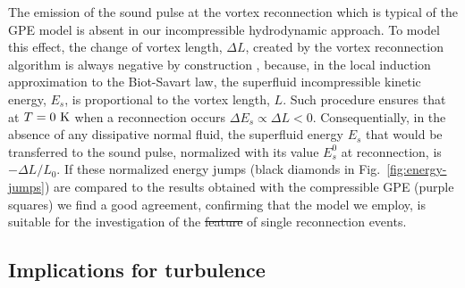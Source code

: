 \documentclass[9pt,twocolumn,twoside]{pnas-new}
\providecommand{\DIFadd}[1]{{\protect\color{blue}\uwave{#1}}} %
\providecommand{\DIFdel}[1]{{\protect\color{red}\sout{#1}}} %
\providecommand{\DIFaddbegin}{} %
\providecommand{\DIFaddend}{} %
\providecommand{\DIFdelbegin}{} %
\providecommand{\DIFdelend}{} %
\newcommand{\DIFscaledelfig}{0.5}
\newlength{\DIFdelgraphicswidth} %
\newlength{\DIFdelgraphicsheight} %
\newcommand{\DIFaddincludegraphics}[2][]{{\color{blue}\fbox{\DIFOincludegraphics[#1]{#2}}}} %
\newcommand{\DIFdelincludegraphics}[2][]{%
\sbox{\DIFdelgraphicsbox}{\DIFOincludegraphics[#1]{#2}}%
\settoboxwidth{\DIFdelgraphicswidth}{\DIFdelgraphicsbox} %
\settoboxtotalheight{\DIFdelgraphicsheight}{\DIFdelgraphicsbox} %
\scalebox{\DIFscaledelfig}{%
\parbox[b]{\DIFdelgraphicswidth}{\usebox{\DIFdelgraphicsbox}\\[-\baselineskip] \rule{\DIFdelgraphicswidth}{0em}}\llap{\resizebox{\DIFdelgraphicswidth}{\DIFdelgraphicsheight}{%
\setlength{\unitlength}{\DIFdelgraphicswidth}%
\begin{picture}(1,1)%
\thicklines\linethickness{2pt} %
{\color[rgb]{1,0,0}\put(0,0){\framebox(1,1){}}}%
{\color[rgb]{1,0,0}\put(0,0){\line( 1,1){1}}}%
{\color[rgb]{1,0,0}\put(0,1){\line(1,-1){1}}}%
\end{picture}%
}\hspace*{3pt}}} %
} %
\DeclareRobustCommand{\DIFaddbegin}{\DIFOaddbegin \let\includegraphics\DIFaddincludegraphics} %
\DeclareRobustCommand{\DIFaddend}{\DIFOaddend \let\includegraphics\DIFOincludegraphics} %
\DeclareRobustCommand{\DIFdelbegin}{\DIFOdelbegin \let\includegraphics\DIFdelincludegraphics} %
\DeclareRobustCommand{\DIFdelend}{\DIFOaddend \let\includegraphics\DIFOincludegraphics} %
\begin{document}
The emission of the sound pulse at the vortex reconnection 
\cite{leadbeaterSoundEmissionDue2001b} which is typical of the GPE model
is absent in our incompressible hydrodynamic approach. To model
this effect, the change of vortex length, $\Delta L$, created by the
vortex reconnection algorithm is always negative by construction
\cite{baggaleySensitivityVortexFilament2012a},
because, in the local induction approximation to the Biot-Savart law, 
the superfluid incompressible kinetic energy, $E_s$, is proportional to the vortex length,
$L$. Such procedure ensures that at $T=0~{\rm K}$ when a reconnection occurs
$\Delta E_s\propto \Delta L < 0$.
Consequentially, in the absence of any dissipative normal fluid, 
the superfluid energy 
$E_s$ that would be transferred to the sound pulse, normalized with its value $E_s^0$ at 
reconnection, is $-\Delta L/L_0$. 
If these normalized energy jumps (black diamonds
in Fig.~\ref{fig:energy-jumps}) are compared to the results obtained with the 
compressible GPE \cite{villoisIrreversibleDynamicsVortex2020} (purple squares)
we find a good agreement, confirming that the model we employ, 
is suitable for the investigation of the \DIFdelbegin \DIFdel{feature }\DIFdelend \DIFaddbegin \DIFadd{features }\DIFaddend of single reconnection events.

\subsection*{Implications for turbulence}
\end{document}
